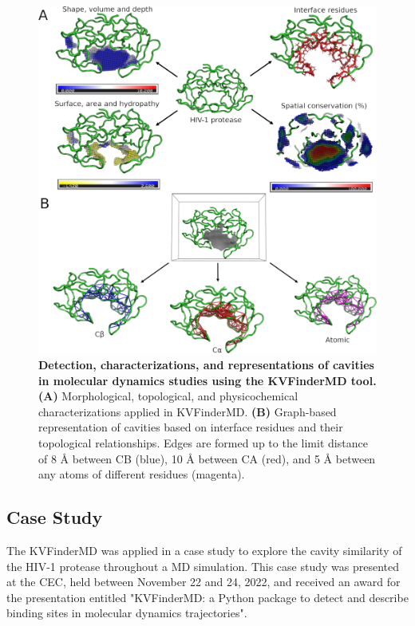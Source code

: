 \documentclass[Ingles]{phdthesis}
\begin{document}
\begin{figure}[h]
  \centering
  \includegraphics[scale=1]{images/kvmd-overview.png}
  \caption[Detection, characterizations, and representations of cavities in molecular dynamics studies using the KVFinderMD tool.]{\textbf{Detection, characterizations, and representations of cavities in molecular dynamics studies using the KVFinderMD tool.} \textbf{(A)} Morphological, topological, and physicochemical characterizations applied in KVFinderMD. \textbf{(B)} Graph-based representation of cavities based on interface residues and their topological relationships. Edges are formed up to the limit distance of  8 Å between \acs{CB} (blue), 10 Å between \acs{CA} (red), and 5 Å between any atoms of different residues (magenta).}
  \label{fig:kvmd-overview}
\end{figure}

\subsection{Case Study}

The KVFinderMD was applied in a case study to explore the cavity similarity of the HIV-1 protease throughout a \acs{MD} simulation. This case study was presented at the \ac{CEC}, held between November 22 and 24, 2022, and received an award for the presentation entitled "KVFinderMD: a Python package to detect and describe binding sites in molecular dynamics trajectories".
\end{document}
